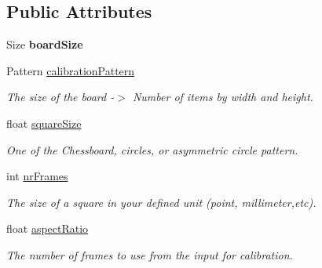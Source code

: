 \subsection*{Public Attributes}
\begin{DoxyCompactItemize}
\item 
\mbox{\label{class_settings_a5030a7164df923bb3b86dd7a0fc9af30}} 
Size {\bfseries board\+Size}
\item 
\mbox{\label{class_settings_a94551b7ffe8ac60311b035b2905e9498}} 
Pattern \mbox{\hyperlink{class_settings_a94551b7ffe8ac60311b035b2905e9498}{calibration\+Pattern}}
\begin{DoxyCompactList}\small\item\em The size of the board -\/$>$ Number of items by width and height. \end{DoxyCompactList}\item 
\mbox{\label{class_settings_a6c94708776ad1ce258fc44f2101f5941}} 
float \mbox{\hyperlink{class_settings_a6c94708776ad1ce258fc44f2101f5941}{square\+Size}}
\begin{DoxyCompactList}\small\item\em One of the Chessboard, circles, or asymmetric circle pattern. \end{DoxyCompactList}\item 
\mbox{\label{class_settings_a7e6654cd0e51791ed687eaa85f8fc143}} 
int \mbox{\hyperlink{class_settings_a7e6654cd0e51791ed687eaa85f8fc143}{nr\+Frames}}
\begin{DoxyCompactList}\small\item\em The size of a square in your defined unit (point, millimeter,etc). \end{DoxyCompactList}\item 
\mbox{\label{class_settings_af55c910308a0d773055d0b19261bb3b8}} 
float \mbox{\hyperlink{class_settings_af55c910308a0d773055d0b19261bb3b8}{aspect\+Ratio}}
\begin{DoxyCompactList}\small\item\em The number of frames to use from the input for calibration. \end{DoxyCompactList}\item 
\mbox{\label{class_settings_a5fe947366441009187d633f9e4663256}} 

\end{DoxyCompactItemize}
